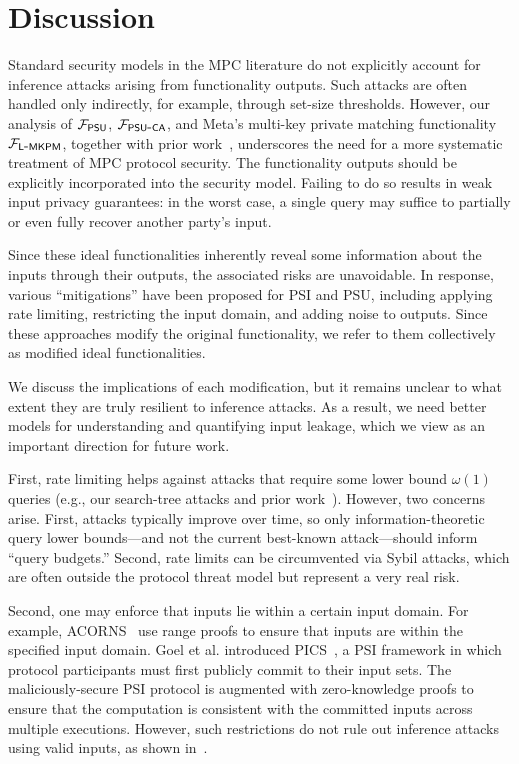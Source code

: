 \section{Discussion}
\label{sec:discussion}

 Standard security models in the MPC literature
do not explicitly account for inference attacks arising from functionality
outputs. Such attacks are often handled only indirectly, for example, through
set-size thresholds. However, our analysis of $\mathcal{F}_{\mathsf{PSU}}$, $\mathcal{F}_{\mathsf{PSU\mbox{-}CA}}$,
and Meta's multi-key private matching functionality $\mathcal{F}_{\mathsf{L\mbox{-}MKPM}}$, together
with prior
work~\cite{USENIX:GHLWJL22,NDSS:JiaDuYan24,USENIX:FalTan25,USENIX:ZinCaoGre23},
underscores the need for a more systematic treatment of MPC protocol
security. The functionality outputs should be explicitly incorporated into the
security model. Failing to do so results in weak input privacy guarantees: in
the worst case, a single query may suffice to partially or even fully recover
another party's input.

 Since these ideal functionalities inherently
reveal some information about the inputs through their outputs, the associated
risks are unavoidable. In response, various ``mitigations'' have been proposed
for PSI and PSU, including applying rate limiting, restricting the input domain,
and adding noise to outputs. Since these approaches modify the original
functionality, we refer to them collectively as modified ideal functionalities.

We discuss the implications of each modification, but it remains unclear to what
extent they are truly resilient to inference attacks. As a result, we need
better models for understanding and quantifying input leakage, which we view as
an important direction for future work.

First, rate limiting helps against attacks that require some lower bound
$\omega(1)$ queries (e.g., our search-tree attacks and prior
work~\cite{USENIX:GHLWJL22,NDSS:JiaDuYan24,USENIX:FalTan25}). However, two
concerns arise. First, attacks typically improve over time, so only
information-theoretic query lower bounds---and not the current best-known
attack---should inform ``query budgets.'' Second, rate limits can be
circumvented via Sybil attacks, which are often outside the protocol threat
model but represent a very real risk.

Second, one may enforce that inputs lie within a certain input domain. For
example, ACORNS~\cite{USENIX:BGLLMR23} use range proofs to ensure that inputs
are within the specified input domain. Goel et al. introduced
PICS~\cite{USENIX:GMVS26}, a PSI framework in which protocol participants must
first publicly commit to their input sets. The maliciously-secure PSI protocol
is augmented with zero-knowledge proofs to ensure that the computation is
consistent with the committed inputs across multiple executions. However, such
restrictions do not rule out inference attacks using valid inputs, as shown
in~\cite{USENIX:FalTan25}.


